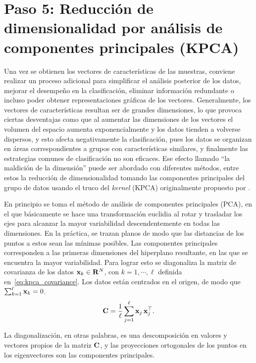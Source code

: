 \section*{Paso 5: Reducción de dimensionalidad por análisis de componentes principales (KPCA)}
\label{sec:kpca_reduction}
Una vez se obtienen los vectores de características de las muestras, conviene realizar un proceso adicional para simplificar el análisis posterior de los datos, mejorar el desempeño en la clasificación, eliminar información redundante o incluso poder obtener representaciones gráficas de los vectores.
Generalmente, los vectores de características resultan ser de grandes dimensiones, lo que provoca ciertas desventajas como que al aumentar las dimensiones de los vectores el volumen del espacio aumenta exponencialmente y los datos tienden a volverse dispersos, y esto afecta negativamente la clasificación, pues los datos se organizan en áreas correspondientes a grupos con características similares, y finalmente las estrategias comunes de clasificación no son eficaces.
Ese efecto llamado ``la maldición de la dimensión'' puede ser abordado con diferentes métodos, entre estos la reducción de dimensionalidad tomando las componentes principales del grupo de datos usando el truco del \emph{kernel} (KPCA) originalmente propuesto por \citet{Scholkopf1997}.

En principio se toma el método de análisis de componentes principales (PCA), en el que básicamente se hace una transformación euclidia al rotar y trasladar los ejes para alcanzar la mayor variabilidad descendentemente en todas las dimensiones.
En la práctica, se trazan planos de modo que las distancias de los puntos a estos sean las mínimas posibles.
Las componentes principales corresponden a las primeras dimensiones del hiperplano resultante, en las que se encuentra la mayor variabilidad.
Para lograr esto se diagonaliza la matriz de covarianza de los datos $\mathrm{\mathbf{x}}_k \in \mathrm{\mathbf{R}}^N$, con $k = 1, \cdots, \ell$ definida en~\eqref{eq:kpca_covariance}.
Los datos están centrados en el origen, de modo que $\sum_{k = 1}^\ell \mathrm{\mathbf{x}}_k = 0$.
%
\begin{equation}
    \label{eq:kpca_covariance}
    \vect{C} = \frac{1}{\ell} \sum_{j = 1}^\ell \vect{x}_j\,\vect{x}_j^\top.
\end{equation}

La diagonalización, en otras palabras, es una descomposición en valores y vectores propios de la matriz $\mathrm{\mathbf{C}}$, y las proyecciones ortogonales de los puntos en los eigenvectores son las componentes principales.

